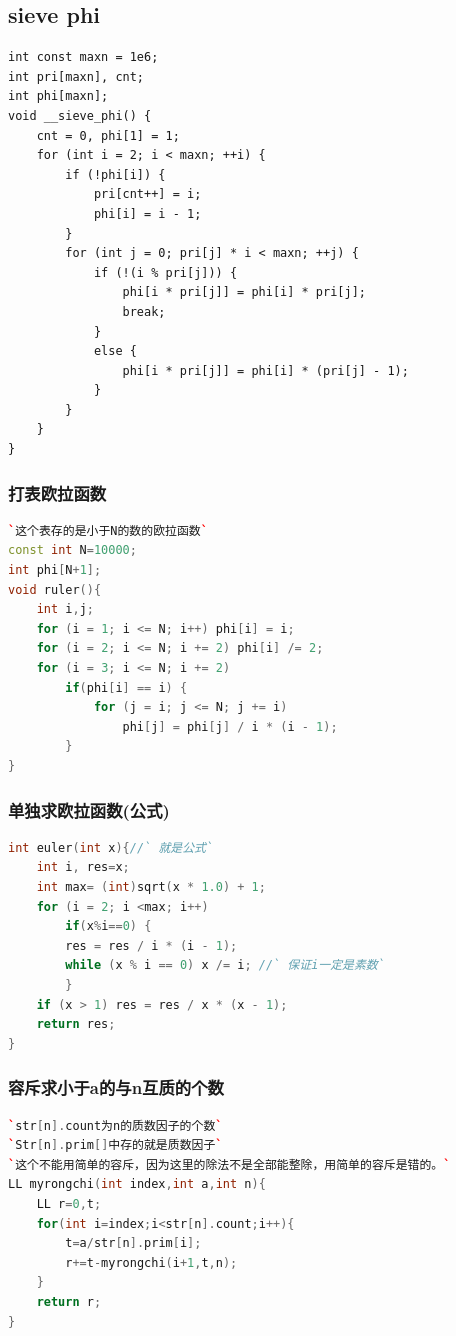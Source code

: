 \documentclass[a4paper]{article}
\begin{document}
\begin{CJK*}{UTF8}{gbsn}
\begin{multicols}{3}
\begin{flushleft}
\subsection{sieve phi}
\begin{lstlisting}
int const maxn = 1e6;
int pri[maxn], cnt;
int phi[maxn];
void __sieve_phi() {
    cnt = 0, phi[1] = 1;
    for (int i = 2; i < maxn; ++i) {
        if (!phi[i]) {
            pri[cnt++] = i;
            phi[i] = i - 1;
        }
        for (int j = 0; pri[j] * i < maxn; ++j) {
            if (!(i % pri[j])) {
                phi[i * pri[j]] = phi[i] * pri[j];
                break;
            }
            else {
                phi[i * pri[j]] = phi[i] * (pri[j] - 1);
            }
        }
    }
}
\end{lstlisting}

\subsubsection{打表欧拉函数}
\begin{lstlisting}[language={c++}]
`这个表存的是小于N的数的欧拉函数`
const int N=10000; 
int phi[N+1]; 
void ruler(){ 
	int i,j; 
	for (i = 1; i <= N; i++) phi[i] = i;
	for (i = 2; i <= N; i += 2) phi[i] /= 2;
	for (i = 3; i <= N; i += 2) 
		if(phi[i] == i) {
			for (j = i; j <= N; j += i)
				phi[j] = phi[j] / i * (i - 1);
		}
} 
\end{lstlisting}


\subsubsection{单独求欧拉函数(公式)}
\begin{lstlisting}[language={c++}]
int euler(int x){//` 就是公式`
	int i, res=x;
	int max= (int)sqrt(x * 1.0) + 1; 
	for (i = 2; i <max; i++)
		if(x%i==0) {
		res = res / i * (i - 1);
		while (x % i == 0) x /= i; //` 保证i一定是素数`
		}
	if (x > 1) res = res / x * (x - 1);
	return res;
}
\end{lstlisting}


\subsubsection{容斥求小于a的与n互质的个数}
\begin{lstlisting}[language={c++}]
`str[n].count为n的质数因子的个数`
`Str[n].prim[]中存的就是质数因子`
`这个不能用简单的容斥，因为这里的除法不是全部能整除，用简单的容斥是错的。`
LL myrongchi(int index,int a,int n){
	LL r=0,t;
	for(int i=index;i<str[n].count;i++){
		t=a/str[n].prim[i];
		r+=t-myrongchi(i+1,t,n);
	}
	return r;	
}
\end{lstlisting}


\end{flushleft}
\end{multicols}
\end{CJK*}
\end{document}
